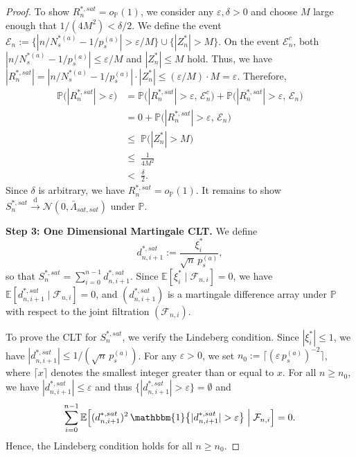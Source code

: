 \documentclass{article}
\numberwithin{equation}{section}
\newcommand{\indicator}{\mathbbm{1}}
\begin{document}
\begin{proof}
To show $R_n^{\ast,sat}=o_{\mathbb{P}}(1)$, we consider any $\varepsilon,\delta>0$ and choose $M$ large enough that $1/(4M^2)<\delta/2$. 
We define the event $\mathcal{E}_n := \{|n/N_s^{\ast(a)}-1/p_s^{(a)}|>\varepsilon/M\}\cup\{|Z_n^\ast|>M\}$. 
On the event $\mathcal{E}_n^c$, both $|n/N_s^{\ast(a)}-1/p_s^{(a)}|\le\varepsilon/M$ and $|Z_n^\ast|\le M$ hold. Thus, we have $|R_n^{\ast,sat}|=|n/N_s^{\ast(a)}-1/p_s^{(a)}|\cdot|Z_n^\ast|\le(\varepsilon/M)\cdot M=\varepsilon$. 
Therefore,
\begin{align*}
\mathbb{P}\bigl(|R_n^{\ast,sat}|>\varepsilon\bigr)
& = \mathbb{P}\bigl(|R_n^{\ast,sat}|>\varepsilon,\,\mathcal{E}_n^c\bigr) + \mathbb{P}\bigl(|R_n^{\ast,sat}|>\varepsilon,\,\mathcal{E}_n\bigr)\\
& = 0 + \mathbb{P}\bigl(|R_n^{\ast,sat}|>\varepsilon,\,\mathcal{E}_n\bigr) \\
&\le\; \mathbb{P}\bigl(|Z_n^\ast|>M\bigr)\\
&\le\; \frac{1}{4M^2} \\
&<\; \frac{\delta}{2}.
\end{align*}
Since $\delta$ is arbitrary, we have $R_n^{\ast,sat}=o_{\mathbb{P}}(1)$.
It remains to show $S_n^{\ast,sat}\xrightarrow{\mathrm{d}}\mathcal{N}(0,\bar\Lambda_{sat,sat})$ under $\mathbb{P}$.

\medskip\noindent\textbf{Step 3: One Dimensional Martingale CLT.}
We define
\[
d_{n,i+1}^{\ast,sat} := \frac{\xi_i^\ast}{\sqrt{n}\,p_s^{(a)}},
\]
so that $S_n^{\ast,sat}=\sum_{i=0}^{n-1}d_{n,i+1}^{\ast,sat}$. Since $\mathbb{E}[\xi_i^\ast \mid \mathcal{F}_{n,i}]=0$, we have $\mathbb{E}[d_{n,i+1}^{\ast,sat}\mid\mathcal{F}_{n,i}]=0$, and $(d_{n,i+1}^{\ast,sat})$ is a martingale difference array under $\mathbb{P}$ with respect to the joint filtration $(\mathcal{F}_{n,i})$.

To prove the CLT for $S_n^{\ast,sat}$, we verify the Lindeberg condition.
Since $|\xi_i^\ast|\le 1$, we have $|d_{n,i+1}^{\ast,sat}|\le 1/(\sqrt{n}\,p_s^{(a)})$. For any $\varepsilon>0$, we set $n_0:=\lceil(\varepsilon\, p_s^{(a)})^{-2}\rceil$, where $\lceil x \rceil$ denotes the smallest integer greater than or equal to $x$.
For all $n\ge n_0$, we have $|d_{n,i+1}^{\ast,sat}|\le\varepsilon$ and thus $\{|d_{n,i+1}^{\ast,sat}|>\varepsilon\}=\emptyset$ and
\[
\sum_{i=0}^{n-1}\mathbb{E}\Bigl[(d_{n,i+1}^{\ast,sat})^2\,\indicator\bigl\{|d_{n,i+1}^{\ast,sat}|>\varepsilon\bigr\}\;\Big|\;\mathcal{F}_{n,i}\Bigr]=0.
\]
Hence, the Lindeberg condition holds for all $n\ge n_0$.


\end{proof}
\end{document}
